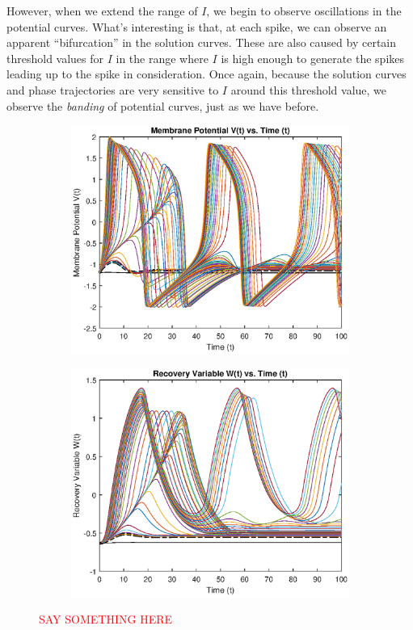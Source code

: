 \documentclass{book}
\theoremstyle{definition}
\begin{document}
However, when we extend the range of $I$, we begin to observe oscillations in the potential curves. What's interesting is that, at each spike, we can observe an apparent ``bifurcation'' in the solution curves. These are also caused by certain threshold values for $I$ in the range where $I$ is high enough to generate the spikes leading up to the spike in consideration. Once again, because the solution curves and phase trajectories are very sensitive to $I$ around this threshold value, we observe the \textit{banding} of potential curves, just as we have before. 


\begin{figure}[!htb]
	\centering
	\begin{subfigure}{0.5\textwidth}
		\centering
		\includegraphics[scale=0.6]{FHN_lab/V_t_I_2.eps}
	\end{subfigure}%
	\begin{subfigure}{0.5\textwidth}
		\centering
		\includegraphics[scale=0.6]{FHN_lab/W_t_I_2.eps}
		
	\end{subfigure}%
	\caption{\textcolor{red}{SAY SOMETHING HERE}}
	\label{Fig:12}
\end{figure}
\end{document}
